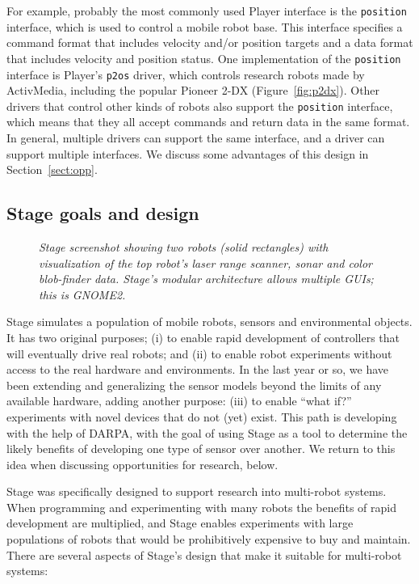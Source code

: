 \documentclass[a4paper]{ICAR2003}
\begin{document}
For example, probably the most commonly used Player interface is the
{\tt position} interface, which is used to control a mobile robot base.
This interface specifies a command format that includes velocity and/or
position targets and a data format that includes velocity and position status.
One implementation of the {\tt position} interface is Player's {\tt p2os}
driver, which controls research robots made by ActivMedia, including the
popular Pioneer 2-DX (Figure~\ref{fig:p2dx}).  Other drivers that control
other kinds of robots also support the {\tt position} interface, which
means that they all accept commands and return data in the same format.
In general, multiple drivers can support the same interface, and a driver
can support multiple interfaces.  We discuss some advantages of this design in
Section~\ref{sect:opp}.

\subsection{Stage goals and design}
\label{sect:stage}
\begin{figure}
  \centering
  \caption{{\sl Stage screenshot showing two robots (solid rectangles) with visualization of the top robot's laser range scanner, sonar and color blob-finder data. Stage's modular architecture allows multiple GUIs; this is GNOME2.}}
  \label{fig:screenshot}
\end{figure}


Stage simulates a population of mobile robots, sensors and
environmental objects. It has two original purposes; (i) to enable
rapid development of controllers that will eventually drive real
robots; and (ii) to enable robot experiments without access to the
real hardware and environments. In the last year or so, we have been
extending and generalizing the sensor models beyond the limits of any
available hardware, adding another purpose: (iii) to enable ``what
if?'' experiments with novel devices that do not (yet) exist.  This
path is developing with the help of DARPA, with the goal of using
Stage as a tool to determine the likely benefits of developing one
type of sensor over another. We return to this idea when discussing
opportunities for research, below.

Stage was specifically designed to support research into multi-robot
systems. When programming and experimenting with many robots the
benefits of rapid development are multiplied, and Stage enables
experiments with large populations of robots that would be
prohibitively expensive to buy and maintain. There are several aspects
of Stage's design that make it suitable for multi-robot systems:
\end{document}
